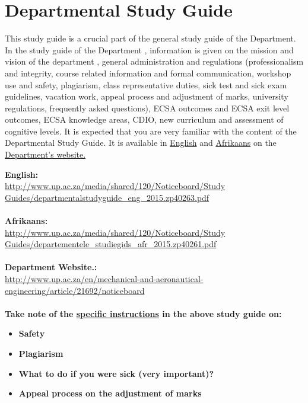 \section{Departmental Study Guide} \label{sec:dep_study_guide}
    This study guide is a crucial part of the general study guide of the
    Department. In the study guide of the Department , information is given
    on the mission and vision of the department , general administration and
    regulations (professionalism and integrity, course related information
    and formal communication, workshop use and safety, plagiarism, class
    representative duties, sick test and sick exam guidelines, vacation work,
    appeal process and adjustment of marks, university regulations, frequently
    asked questions), ECSA outcomes and ECSA exit level outcomes, ECSA
    knowledge areas, CDIO, new curriculum and assessment of cognitive levels.
    It is expected that you are very familiar with the content of the
    Departmental Study Guide. It is available in
    \href{http://www.up.ac.za/media/shared/120/Noticeboard/Study Guides/departmentalstudyguide_eng_2015.zp40263.pdf}{English}
    and
    \href{http://www.up.ac.za/media/shared/120/Noticeboard/Study Guides/departementele_studiegids_afr_2015.zp40261.pdf}{Afrikaans}
    on the
    \href{http://www.up.ac.za/en/mechanical-and-aeronautical-engineering/article/21692/noticeboard}{Department’s website.}

    \noindent
    \textbf{English:} \\
    \url{http://www.up.ac.za/media/shared/120/Noticeboard/Study Guides/departmentalstudyguide_eng_2015.zp40263.pdf} \\~\\
    \textbf{Afrikaans:} \\
    \url{http://www.up.ac.za/media/shared/120/Noticeboard/Study Guides/departementele_studiegids_afr_2015.zp40261.pdf} \\~\\
    \textbf{Department Website.:} \\
    \url{http://www.up.ac.za/en/mechanical-and-aeronautical-engineering/article/21692/noticeboard} \\~\\

    \noindent
    \textbf{Take note of the \uline{specific instructions} in the above study guide on:}
    \begin{itemize}
        \item \textbf{Safety}
        \item \textbf{Plagiarism}
        \item \textbf{What to do if you were sick (very important)?}
        \item \textbf{Appeal process on the adjustment of marks}
    \end{itemize}
